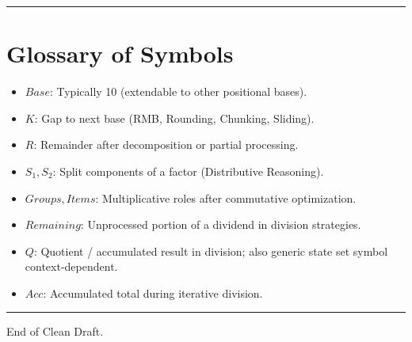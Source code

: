 \documentclass[
]{article}
\providecommand{\tightlist}{%
  \setlength{\itemsep}{0pt}\setlength{\parskip}{0pt}}
\begin{document}
\begin{center}\rule{0.5\linewidth}{0.5pt}\end{center}

\section{Glossary of Symbols}\label{glossary-of-symbols}

\begin{itemize}
\tightlist
\item
  \(Base\): Typically 10 (extendable to other positional bases).
\item
  \(K\): Gap to next base (RMB, Rounding, Chunking, Sliding).
\item
  \(R\): Remainder after decomposition or partial processing.
\item
  \(S_1, S_2\): Split components of a factor (Distributive Reasoning).
\item
  \(Groups, Items\): Multiplicative roles after commutative
  optimization.
\item
  \(Remaining\): Unprocessed portion of a dividend in division
  strategies.
\item
  \(Q\): Quotient / accumulated result in division; also generic state
  set symbol context-dependent.
\item
  \(Acc\): Accumulated total during iterative division.
\end{itemize}

\begin{center}\rule{0.5\linewidth}{0.5pt}\end{center}

End of Clean Draft.
\end{document}
